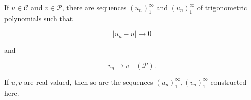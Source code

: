 If $u \in \mathcal{C}$ and $v \in \mathcal{P}$, there are sequences $(u_n)_{1}^{\infty}$ and $(v_n)_{1}^{\infty}$ of trigonometric polynomials such that

$$|u_n - u| \to 0$$

and

$$v_n \to v \quad (\mathcal{P}).$$

If $u, v$ are real-valued, then so are the sequences $(u_n)_{1}^{\infty}, (v_n)_{1}^{\infty}$ constructed here.
